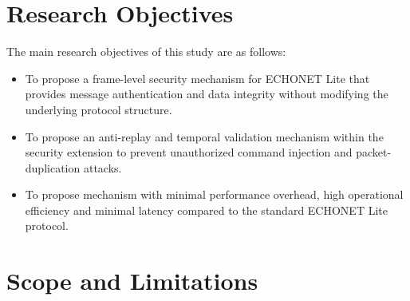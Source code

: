 \section{Research Objectives}

The main research objectives of this study are as follows:

\begin{itemize}[nosep]
  \item To propose a frame-level security mechanism for ECHONET Lite that provides message authentication and data integrity without modifying the underlying protocol structure.
  \item To propose an anti-replay and temporal validation mechanism within the security extension to prevent unauthorized command injection and packet-duplication attacks.
  \item To propose mechanism with minimal performance overhead, high operational efficiency and minimal latency compared to the standard ECHONET Lite protocol.
\end{itemize}


\section{Scope and Limitations}





